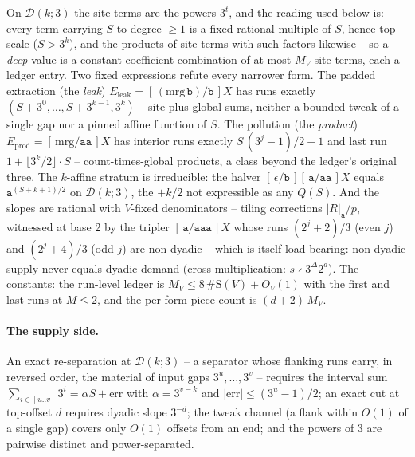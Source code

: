 \documentclass[runningheads,envcountsect]{llncs}
\begin{document}
\noindent On $\mathcal D(k;3)$ the site terms are the powers $3^t$, and the reading used below is: every term carrying $S$ to degree $\ge 1$ is a fixed rational multiple of $S$, hence top-scale ($S > 3^k$), and the products of site terms with such factors likewise -- so a \emph{deep} value is a constant-coefficient combination of at most $M_V$ site terms, each a ledger entry. Two fixed expressions refute every narrower form. The padded extraction (the \emph{leak}) $E_{\mathrm{leak}} = [\,(\mathrm{mrg}\,\mathtt b)/\mathtt b\,]X$ has runs exactly $(S + 3^0, \ldots, S + 3^{k-1}, 3^k)$ -- site-plus-global sums, neither a bounded tweak of a single gap nor a pinned affine function of $S$. The pollution (the \emph{product}) $E_{\mathrm{prod}} = [\,\mathrm{mrg}/\mathtt{aa}\,]X$ has interior runs exactly $S\,(3^j - 1)/2 + 1$ and last run $1 + \lfloor 3^k/2 \rfloor \cdot S$ -- count-times-global products, a class beyond the ledger's original three. The $k$-affine stratum is irreducible: the halver $[\,\epsilon/\mathtt b\,][\,\mathtt a/\mathtt{aa}\,]X$ equals $\mathtt a^{(S+k+1)/2}$ on $\mathcal D(k;3)$, the $+k/2$ not expressible as any $Q(S)$. And the slopes are rational with $V$-fixed denominators -- tiling corrections $|R|_{\mathtt a}/p$, witnessed at base 2 by the tripler $[\,\mathtt a/\mathtt{aaa}\,]X$ whose runs $(2^j + 2)/3$ (even $j$) and $(2^j + 4)/3$ (odd $j$) are non-dyadic -- which is itself load-bearing: non-dyadic supply never equals dyadic demand (cross-multiplication: $s \nmid 3^{\Delta} 2^{d}$). The constants: the run-level ledger is $M_V \le 8\,\#\mathrm{S}(V) + O_V(1)$ with the first and last runs at $M \le 2$, and the per-form piece count is $(d+2)\,M_V$.

\paragraph{The supply side.}

\begin{lemma}
    \label{dich:lem:L2.1}
    An exact re-separation at $\mathcal D(k;3)$ -- a separator whose flanking runs carry, in reversed order, the material of input gaps $3^u, \ldots, 3^v$ -- requires the interval sum $\sum_{i \in [u..v]} 3^i = \alpha S + \mathrm{err}$ with $\alpha = 3^{v-k}$ and $|\mathrm{err}| \le (3^u-1)/2$; an exact cut at top-offset $d$ requires dyadic slope $3^{-d}$; the tweak channel (a flank within $O(1)$ of a single gap) covers only $O(1)$ offsets from an end; and the powers of $3$ are pairwise distinct and power-separated.
\end{lemma}
\end{document}
